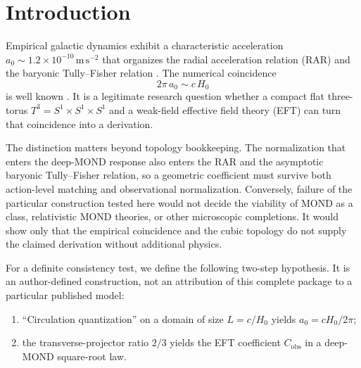 \documentclass[aps,prd,reprint,superscriptaddress,nofootinbib,floatfix,showkeys]{revtex4-2}
\newcommand{\Tthree}{T^{3}}
\newcommand{\Cobs}{C_{\mathrm{obs}}}
\newcommand{\azero}{a_{0}}
\newcommand{\Hzero}{H_{0}}
\begin{document}

\maketitle

\section{Introduction}
\label{sec:intro}

Empirical galactic dynamics exhibit a characteristic acceleration
\(\azero\sim 1.2\times 10^{-10}\,\mathrm{m\,s^{-2}}\) that organizes the
radial acceleration relation (RAR) and the baryonic Tully--Fisher relation
\cite{mond,famaey_mcgaugh,mcgaugh_rar,lelli_rar}.
The numerical coincidence
\begin{equation}
  2\pi\,\azero \sim c\,\Hzero
  \label{eq:coincidence}
\end{equation}
is well known \cite{mond,famaey_mcgaugh}.  It is a legitimate research question
whether a compact flat three-torus \(\Tthree=S^{1}\times S^{1}\times S^{1}\)
\cite{lachieze_rey_luminet,planck_topology} and a weak-field effective field
theory (EFT) can turn that coincidence into a derivation.

The distinction matters beyond topology bookkeeping.  The normalization that
enters the deep-MOND response also enters the RAR and the asymptotic baryonic
Tully--Fisher relation, so a geometric coefficient must survive both
action-level matching and observational normalization.  Conversely, failure
of the particular construction tested here would not decide the viability of
MOND as a class, relativistic MOND theories, or other microscopic completions.
It would show only that the empirical coincidence and the cubic topology do
not supply the claimed derivation without additional physics.

For a definite consistency test, we define the following two-step hypothesis.
It is an author-defined construction, not an attribution of this complete
package to a particular published model:
\begin{enumerate}
\item[(A)] ``Circulation quantization'' on a domain of size \(L=c/\Hzero\)
  yields \(\azero=c\Hzero/2\pi\);
\item[(B)] the transverse-projector ratio \(2/3\) yields the EFT coefficient
  \(\Cobs\) in a deep-MOND square-root law.
\end{enumerate}
\end{document}
